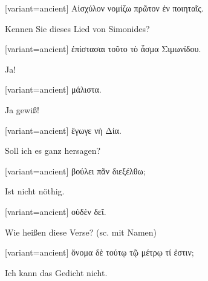 \begin{greek}[variant=ancient]%
Αἰσχύλον νομίζω πρῶτον ἐν ποιηταῖς.

\end{greek}%
\switchcolumn*

Kennen Sie dieses Lied von Simonides? 

\switchcolumn

\begin{greek}[variant=ancient]%
ἐπίστασαι τοῦτο τὸ ἆσμα Σιμωνίδου.

\end{greek}%
\switchcolumn*

Ja! 

\switchcolumn

\begin{greek}[variant=ancient]%
μάλιστα.

\end{greek}%
\switchcolumn*

Ja gewiß! 

\switchcolumn

\begin{greek}[variant=ancient]%
ἔγωγε νὴ Δία\textgerman[spelling=old,babelshorthands=true]{.}

\end{greek}%
\switchcolumn*

Soll ich es ganz hersagen? 

\switchcolumn

\begin{greek}[variant=ancient]%
βούλει πᾶν διεξέλθω;

\end{greek}%
\switchcolumn*

Ist nicht nöthig. 

\switchcolumn

\begin{greek}[variant=ancient]%
οὐδὲν δεῖ.

\end{greek}%
\switchcolumn*

Wie heißen diese Verse? (\textlatin{sc.} mit Namen) 

\switchcolumn

\begin{greek}[variant=ancient]%
ὄνομα δὲ τούτῳ τῷ μέτρῳ τί ἐστιν;

\end{greek}%
\switchcolumn*

Ich kann das Gedicht nicht. 

\switchcolumn

